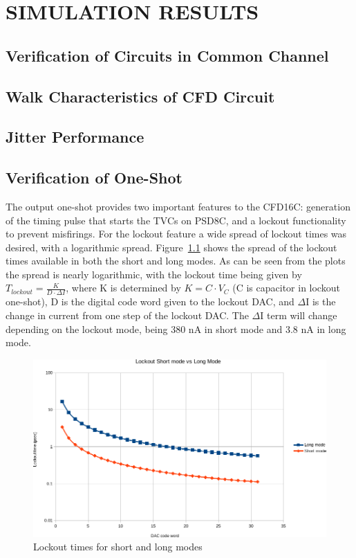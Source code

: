 \documentclass[12pt,oneside,final]{siuethesis}
\theoremstyle{definition}
\begin{document}
\chapter{SIMULATION RESULTS}

\section{Verification of Circuits in Common Channel}

\section{Walk Characteristics of CFD Circuit}

\section{Jitter Performance}

\section{Verification of One-Shot}

\par The output one-shot provides two important features to the CFD16C: generation of the timing pulse that starts the TVCs on PSD8C, and a lockout functionality to prevent misfirings. For the lockout feature a wide spread of lockout times was desired, with a logarithmic spread. Figure~\ref{fig:lockout-spread} shows the spread of the lockout times available in both the short and long modes. As can be seen from the plots the spread is nearly logarithmic, with the lockout time being given by $T_{lockout} = \frac{K}{D\cdot \Delta I}$, where K is determined by $K = C\cdot V_{C}$ (C is capacitor in lockout one-shot), D is the digital code word given to the lockout DAC, and $\Delta$I is the change in current from one step of the lockout DAC. The $\Delta$I term will change depending on the lockout mode, being 380 nA in short mode and 3.8 nA in long mode. 

\begin{figure}[htbp!]
 \centering
 \includegraphics[scale=.63,keepaspectratio=true]{./ch4_figures/lockout_plot.png}
 \caption{Lockout times for short and long modes}
 \label{fig:lockout-spread}
\end{figure}
\end{document}
